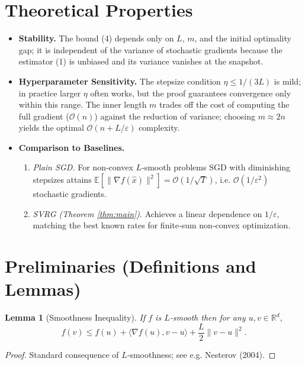 \documentclass{article}
\newtheorem{lemma}{Lemma}
\newcommand{\EE}{\mathbb{E}}
\newcommand{\grad}{\nabla}
\begin{document}
\section*{Theoretical Properties}
\begin{itemize}
\item \textbf{Stability.} The bound (4) depends only on $L$, $m$, and the initial optimality gap; it is independent of the variance of stochastic gradients because the estimator (1) is unbiased and its variance vanishes at the snapshot.
\item \textbf{Hyperparameter Sensitivity.} The stepsize condition $\eta\le 1/(3L)$ is mild; in practice larger $\eta$ often works, but the proof guarantees convergence only within this range. The inner length $m$ trades off the cost of computing the full gradient ($\mathcal{O}(n)$) against the reduction of variance; choosing $m\approx 2n$ yields the optimal $\mathcal{O}(n+L/\varepsilon)$ complexity.
\item \textbf{Comparison to Baselines.}
    \begin{enumerate}
        \item \emph{Plain SGD.} For non‑convex $L$‑smooth problems SGD with diminishing stepsizes attains $\EE[\|\grad f(\hat{x})\|^{2}]=\mathcal{O}(1/\sqrt{T})$, i.e. $\mathcal{O}(1/\varepsilon^{2})$ stochastic gradients.
        \item \emph{SVRG (Theorem \ref{thm:main})}. Achieves a linear dependence on $1/\varepsilon$, matching the best known rates for finite‑sum non‑convex optimization.
    \end{enumerate}
\end{itemize}

\section*{Preliminaries (Definitions and Lemmas)}
\begin{lemma}[Smoothness Inequality]\label{lem:smooth}
If $f$ is $L$‑smooth then for any $u,v\in\mathbb{R}^d$,
\[
f(v)\le f(u)+\langle \grad f(u),v-u\rangle+\frac{L}{2}\|v-u\|^{2}.
\tag{5}
\]
\end{lemma}
\begin{proof}
Standard consequence of $L$‑smoothness; see e.g. Nesterov (2004). \qedhere
\end{proof}
\end{document}
